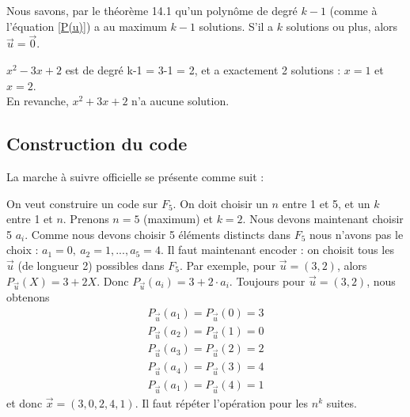 \documentclass[11pt,a4paper]{article}
\begin{document}
Nous savons, par le théorème 14.1 qu'un polynôme de degré $k-1$ (comme à l'équation \eqref{P(u)}) a au maximum $k-1$ solutions. S'il a $k$ solutions ou plus, alors $\vec{u} = \vec{0}$.
\begin{exemple}
	$x^2 - 3x + 2$ est de degré k-1 = 3-1 = 2, et a exactement 2 solutions : $x= 1$ et $x=2$.\\
	En revanche, $x^2 + 3x + 2$ n'a aucune solution.
\end{exemple}


\subsection{Construction du code}
La marche à suivre officielle se présente comme suit :\\
\begin{exemple}
	 On veut construire un code sur $F_5$. On doit choisir un $n$ entre 1 et 5, et un $k$ entre 1 et $n$. Prenons $n=5$ (maximum) et $k = 2$. Nous devons maintenant choisir 5 $a_i$. Comme nous devons choisir 5 éléments distincts dans $F_5$ nous n'avons pas le choix : $a_1 = 0,\ a_2 = 1,...,a_5 = 4$. Il faut maintenant encoder : on choisit tous les $\vec{u}$ (de longueur 2) possibles dans $F_5$. Par exemple, pour $\vec{u} = (3,2)$, alors $P_{\vec{u}}(X) = 3+2X$. Donc $P_{\vec{u}}(a_i) = 3 + 2\cdot a_i$. Toujours pour $\vec{u} = (3,2)$, nous obtenons 
	\begin{align*}
		P_{\vec{u}}(a_1) = P_{\vec{u}}(0) = 3\\
		P_{\vec{u}}(a_2) = P_{\vec{u}}(1) = 0\\
		P_{\vec{u}}(a_3) = P_{\vec{u}}(2) = 2\\
		P_{\vec{u}}(a_4) = P_{\vec{u}}(3) = 4\\
		P_{\vec{u}}(a_1) = P_{\vec{u}}(4) = 1
	\end{align*}
	et donc $\vec{x} = (3,0,2,4,1)$. Il faut répéter l'opération pour les $n^k$ suites.
\end{exemple}
\end{document}
